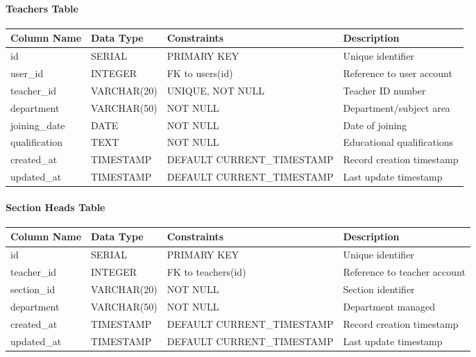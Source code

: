 \documentclass[12pt,a4paper]{report}
\begin{document}
\paragraph{Teachers Table}
\begin{longtable}{|p{3cm}|p{3cm}|p{2cm}|p{6cm}|}
\hline
\textbf{Column Name} & \textbf{Data Type} & \textbf{Constraints} & \textbf{Description} \\
\hline
\endhead
id & SERIAL & PRIMARY KEY & Unique identifier \\
\hline
user\_id & INTEGER & FK to users(id) & Reference to user account \\
\hline
teacher\_id & VARCHAR(20) & UNIQUE, NOT NULL & Teacher ID number \\
\hline
department & VARCHAR(50) & NOT NULL & Department/subject area \\
\hline
joining\_date & DATE & NOT NULL & Date of joining \\
\hline
qualification & TEXT & NOT NULL & Educational qualifications \\
\hline
created\_at & TIMESTAMP & DEFAULT CURRENT\_TIMESTAMP & Record creation timestamp \\
\hline
updated\_at & TIMESTAMP & DEFAULT CURRENT\_TIMESTAMP & Last update timestamp \\
\hline
\end{longtable}

\paragraph{Section Heads Table}
\begin{longtable}{|p{3cm}|p{3cm}|p{2cm}|p{6cm}|}
\hline
\textbf{Column Name} & \textbf{Data Type} & \textbf{Constraints} & \textbf{Description} \\
\hline
\endhead
id & SERIAL & PRIMARY KEY & Unique identifier \\
\hline
teacher\_id & INTEGER & FK to teachers(id) & Reference to teacher account \\
\hline
section\_id & VARCHAR(20) & NOT NULL & Section identifier \\
\hline
department & VARCHAR(50) & NOT NULL & Department managed \\
\hline
created\_at & TIMESTAMP & DEFAULT CURRENT\_TIMESTAMP & Record creation timestamp \\
\hline
updated\_at & TIMESTAMP & DEFAULT CURRENT\_TIMESTAMP & Last update timestamp \\
\hline
\end{longtable}
\end{document}
